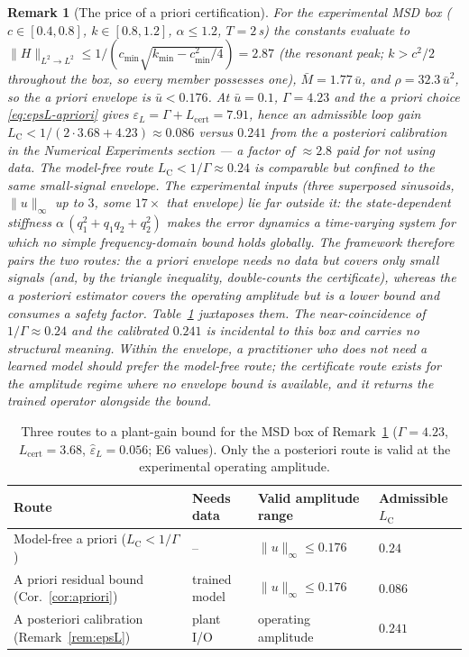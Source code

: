 \documentclass[11pt,sagev,times]{sagej}
\newtheorem{remark}{Remark}
\newcommand{\Ltwo}{L^2}
\newcommand{\Lhat}{L_{\mathrm{cert}}}
\newcommand{\epsL}{\varepsilon_L}
\newcommand{\LC}{L_{\mathrm{C}}}
\begin{document}
\begin{remark}[The price of a priori certification]\label{rem:price}
For the experimental MSD box ($c\in[0.4,0.8]$, $k\in[0.8,1.2]$,
$\alpha\le1.2$, $T=2$\,s) the constants evaluate to
$\|H\|_{\Ltwo\to\Ltwo}\le 1/(c_{\min}\sqrt{k_{\min}-c_{\min}^2/4})=2.87$
(the resonant peak; $k>c^2/2$ throughout the box, so every member possesses
one), $\bar M=1.77\,\bar u$, and $\rho=32.3\,\bar u^2$, so the a priori
envelope is $\bar u<0.176$. At $\bar u=0.1$, $\Gamma=4.23$ and the a priori
choice \eqref{eq:epsL-apriori} gives $\epsL=\Gamma+\Lhat=7.91$, hence an
admissible loop gain $\LC<1/(2\cdot3.68+4.23)\approx0.086$ versus $0.241$
from the a posteriori calibration in the Numerical Experiments section --- a
factor of $\approx2.8$ paid for not using data. The model-free route
$\LC<1/\Gamma\approx0.24$ is comparable but confined to the same
small-signal envelope. The experimental inputs (three superposed sinusoids,
$\|u\|_\infty$ up to $3$, some $17\times$ that envelope) lie far outside
it: the state-dependent stiffness $\alpha\,(q_1^2+q_1q_2+q_2^2)$ makes the
error dynamics a \emph{time-varying} system for which no simple
frequency-domain bound holds globally. The framework therefore pairs the two
routes: the a priori envelope needs no data but covers only small signals
(and, by the triangle inequality, double-counts the certificate), whereas
the a posteriori estimator covers the operating amplitude but is a lower
bound and consumes a safety factor. Table~\ref{tab:routes} juxtaposes them.
The near-coincidence of $1/\Gamma\approx0.24$ and the calibrated $0.241$ is
incidental to this box and carries no structural meaning. Within the
envelope, a practitioner who does not need a learned model should prefer the
model-free route; the certificate route exists for the amplitude regime
where no envelope bound is available, and it returns the trained operator
alongside the bound.
\end{remark}

\begin{table}[t]
\centering\small
\caption{Three routes to a plant-gain bound for the MSD box of
Remark~\ref{rem:price} ($\Gamma=4.23$, $\Lhat=3.68$, $\hat\epsL=0.056$;
E6 values). Only the a posteriori route is valid at the experimental
operating amplitude.}
\label{tab:routes}
\begin{tabular}{p{4.6cm}p{2.2cm}p{3.2cm}p{2.2cm}}
\toprule
Route & Needs data & Valid amplitude range & Admissible $\LC$ \\
\midrule
Model-free a priori ($\LC<1/\Gamma$) & -- & $\|u\|_\infty\le0.176$ & $0.24$ \\
A priori residual bound (Cor.~\ref{cor:apriori}) & trained model & $\|u\|_\infty\le0.176$ & $0.086$ \\
A posteriori calibration (Remark~\ref{rem:epsL}) & plant I/O & operating amplitude & $0.241$ \\
\bottomrule
\end{tabular}
\end{table}
\end{document}
